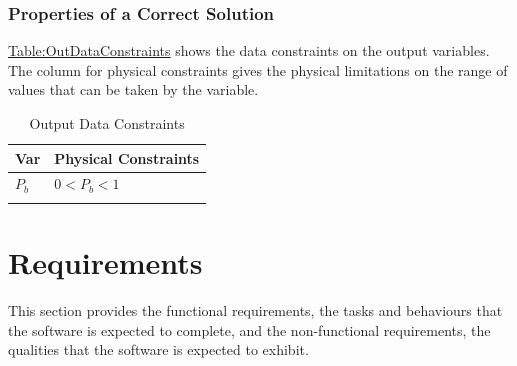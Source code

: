 \documentclass[12pt]{article}
\begin{document}
\subsubsection{Properties of a Correct Solution}
\label{Sec:CorSolProps}
\hyperref[Table:OutDataConstraints]{Table:OutDataConstraints} shows the data constraints on the output variables. The column for physical constraints gives the physical limitations on the range of values that can be taken by the variable.
\begin{longtable}{l l}
\toprule
\textbf{Var} & \textbf{Physical Constraints}
\\
\midrule
\endhead
${P_{b}}$ & $0<{P_{b}}<1$
\\
\bottomrule
\caption{Output Data Constraints}
\label{Table:OutDataConstraints}
\end{longtable}
\section{Requirements}
\label{Sec:Requirements}
This section provides the functional requirements, the tasks and behaviours that the software is expected to complete, and the non-functional requirements, the qualities that the software is expected to exhibit.
\end{document}
